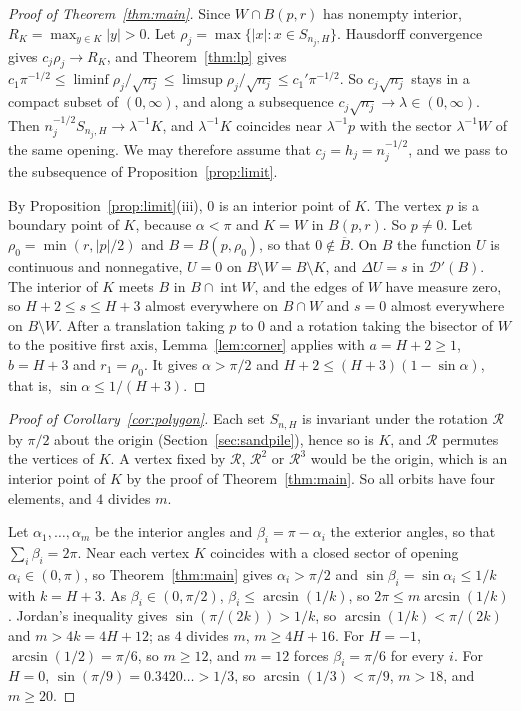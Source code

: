 \documentclass[11pt]{amsart}
\theoremstyle{remark}
\numberwithin{equation}{section}
\newcommand{\D}{\mathcal D}
\begin{document}
\begin{proof}[Proof of Theorem~\ref{thm:main}]
Since $W\cap B(p,r)$ has nonempty interior, $R_K=\max_{y\in K}|y|>0$. Let $\rho_j=\max\{|x|:x\in S_{n_j,H}\}$. Hausdorff convergence gives $c_j\rho_j\to R_K$, and Theorem~\ref{thm:lp} gives $c_1\pi^{-1/2}\le\liminf\rho_j/\sqrt{n_j}\le\limsup\rho_j/\sqrt{n_j}\le c_1'\pi^{-1/2}$. So $c_j\sqrt{n_j}$ stays in a compact subset of $(0,\infty)$, and along a subsequence $c_j\sqrt{n_j}\to\lambda\in(0,\infty)$. Then $n_j^{-1/2}S_{n_j,H}\to\lambda^{-1}K$, and $\lambda^{-1}K$ coincides near $\lambda^{-1}p$ with the sector $\lambda^{-1}W$ of the same opening. We may therefore assume that $c_j=h_j=n_j^{-1/2}$, and we pass to the subsequence of Proposition~\ref{prop:limit}.

By Proposition~\ref{prop:limit}(iii), $0$ is an interior point of $K$. The vertex $p$ is a boundary point of $K$, because $\alpha<\pi$ and $K=W$ in $B(p,r)$. So $p\ne0$. Let $\rho_0=\min(r,|p|/2)$ and $B=B(p,\rho_0)$, so that $0\notin\overline B$. On $B$ the function $U$ is continuous and nonnegative, $U=0$ on $B\setminus W=B\setminus K$, and $\Delta U=s$ in $\D'(B)$. The interior of $K$ meets $B$ in $B\cap\operatorname{int}W$, and the edges of $W$ have measure zero, so $H+2\le s\le H+3$ almost everywhere on $B\cap W$ and $s=0$ almost everywhere on $B\setminus W$. After a translation taking $p$ to $0$ and a rotation taking the bisector of $W$ to the positive first axis, Lemma~\ref{lem:corner} applies with $a=H+2\ge1$, $b=H+3$ and $r_1=\rho_0$. It gives $\alpha>\pi/2$ and $H+2\le(H+3)(1-\sin\alpha)$, that is, $\sin\alpha\le1/(H+3)$.
\end{proof}

\begin{proof}[Proof of Corollary~\ref{cor:polygon}]
Each set $S_{n,H}$ is invariant under the rotation $\mathcal R$ by $\pi/2$ about the origin (Section~\ref{sec:sandpile}), hence so is $K$, and $\mathcal R$ permutes the vertices of $K$. A vertex fixed by $\mathcal R$, $\mathcal R^2$ or $\mathcal R^3$ would be the origin, which is an interior point of $K$ by the proof of Theorem~\ref{thm:main}. So all orbits have four elements, and $4$ divides $m$.

Let $\alpha_1,\dots,\alpha_m$ be the interior angles and $\beta_i=\pi-\alpha_i$ the exterior angles, so that $\sum_i\beta_i=2\pi$. Near each vertex $K$ coincides with a closed sector of opening $\alpha_i\in(0,\pi)$, so Theorem~\ref{thm:main} gives $\alpha_i>\pi/2$ and $\sin\beta_i=\sin\alpha_i\le1/k$ with $k=H+3$. As $\beta_i\in(0,\pi/2)$, $\beta_i\le\arcsin(1/k)$, so $2\pi\le m\arcsin(1/k)$. Jordan's inequality gives $\sin(\pi/(2k))>1/k$, so $\arcsin(1/k)<\pi/(2k)$ and $m>4k=4H+12$; as $4$ divides $m$, $m\ge4H+16$. For $H=-1$, $\arcsin(1/2)=\pi/6$, so $m\ge12$, and $m=12$ forces $\beta_i=\pi/6$ for every $i$. For $H=0$, $\sin(\pi/9)=0.3420\ldots>1/3$, so $\arcsin(1/3)<\pi/9$, $m>18$, and $m\ge20$.
\end{proof}
\end{document}
